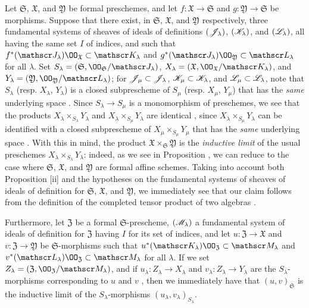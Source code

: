 \begin{env}[10.7.4]
\label{1.10.7.4}
Let $\mathfrak{S}$, $\mathfrak{X}$, and $\mathfrak{Y}$ be formal preschemes, and let $f:\mathfrak{X}\to\mathfrak{S}$ and $g:\mathfrak{Y}\to\mathfrak{S}$ be morphisms.
Suppose that there exist, in $\mathfrak{S}$, $\mathfrak{X}$, and $\mathfrak{Y}$ respectively, three fundamental systems of sheaves of ideals of definitions $(\mathscr{J}_\lambda)$, $(\mathscr{K}_\lambda)$, and $(\mathscr{L}_\lambda)$, all having the same set $I$ of indices, and such that $f^*(\sh{J}_\lambda)\OO_\mathfrak{X}\subset\sh{K}_\lambda$ and $g^*(\sh{J}_\lambda)\OO_\mathfrak{Y}\subset\sh{L}_\lambda$ for all $\lambda$.
Set $S_\lambda=(\mathfrak{S},\OO_\mathfrak{S}/\sh{J}_\lambda)$, $X_\lambda=(\mathfrak{X},\OO_\mathfrak{X}/\sh{K}_\lambda)$, and $Y_\lambda=(\mathfrak{Y},\OO_\mathfrak{Y}/\sh{L}_\lambda)$; for $\mathscr{J}_\mu\subset\mathscr{J}_\lambda$, $\mathscr{K}_\mu\subset\mathscr{K}_\lambda$, and $\mathscr{L}_\mu\subset\mathscr{L}_\lambda$, note that $S_\lambda$ (resp. $X_\lambda$, $Y_\lambda$) is a closed subprescheme of $S_\mu$ (resp. $X_\mu$, $Y_\mu$) that has the \emph{same}
underlying space .
Since $S_\lambda\to S_\mu$ is a monomorphism of preschemes, we see that the products $X_\lambda\times_{S_\lambda}Y_\lambda$ and $X_\lambda\times_{S_\mu}Y_\lambda$ are identical , since $X_\lambda\times_{S_\mu}Y_\lambda$ can be identified with a closed subprescheme of $X_\mu\times_{S_\mu}Y_\mu$ that has the \emph{same} underlying space .
With this in mind, the product $\mathfrak{X}\times_\mathfrak{S}\mathfrak{Y}$ is the \emph{inductive limit} of the usual preschemes $X_\lambda\times_{S_\lambda}Y_\lambda$: indeed, as we see in Proposition , we can reduce to the case where $\mathfrak{S}$, $\mathfrak{X}$, and $\mathfrak{Y}$ are formal affine schemes.
Taking into account both Proposition [ii] and the hypotheses on the fundamental systems of sheaves of ideals of definition for $\mathfrak{S}$, $\mathfrak{X}$, and $\mathfrak{Y}$, we immediately see that our claim follows from the definition of the completed tensor product of two algebras .

Furthermore, let $\mathfrak{Z}$ be a formal $\mathfrak{S}$-prescheme, $(\mathscr{M}_\lambda)$ a fundamental system of ideals of definition for $\mathfrak{Z}$ having $I$ for its set of indices, and let $u:\mathfrak{Z}\to\mathfrak{X}$ and $v:\mathfrak{Z}\to\mathfrak{Y}$ be $\mathfrak{S}$-morphisms such that $u^*(\sh{K}_\lambda)\OO_\mathfrak{Z}\subset\sh{M}_\lambda$ and $v^*(\sh{L}_\lambda)\OO_\mathfrak{Z}\subset\sh{M}_\lambda$ for all $\lambda$.
If we set $Z_\lambda=(\mathfrak{Z},\OO_\mathfrak{Z}/\sh{M}_\lambda)$, and if $u_\lambda:Z_\lambda\to X_\lambda$ and $v_\lambda:Z_\lambda\to Y_\lambda$ are the $S_\lambda$-morphisms corresponding to $u$ and $v$ , then we immediately have that $(u,v)_\mathfrak{S}$ is the inductive limit of the $S_\lambda$-morphisms $(u_\lambda,v_\lambda)_{S_\lambda}$.


\end{env}
